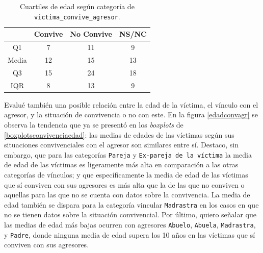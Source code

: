 \documentclass[10 pt]{article}
\begin{document}
\begin{table}[H]
    \centering
    \small
    \begin{center}
    \caption{Cuartiles de edad según categoría de \texttt{victima\_convive\_agresor}.}
    \label{cuartilesconviveedad}
    \begin{tabular}{cccc}
    \hline
    \multicolumn{1}{r}{\textbf{}} & \textbf{Convive} & \textbf{No Convive} & \textbf{ NS/NC} \\ \hline
    Q1                            & 7                    & 11                   & 9                       \\
    Media                         & 12                   & 15                   & 13                      \\
    Q3                            & 15                   & 24                   & 18                      \\
    IQR                           & 8                   & 13                   & 9                     \\ \hline
    \end{tabular}
    \end{center}
    \end{table}


Evalué también una posible relación entre la edad de la víctima, el vínculo con el agresor, y la situación de convivencia o no con este. En la figura \ref{edadconvagr} se observa la tendencia que ya se presentó en los \textit{boxplots} de \ref{boxplotsconvivenciaedad}: las medias de edades de las víctimas según sus situaciones convivenciales con el agresor son similares entre sí. Destaco, sin embargo, que para las categorías \texttt{Pareja} y \texttt{Ex-pareja de la víctima} la media de edad de las víctimas es ligeramente más alta en comparación a las otras categorías de vínculos; y que específicamente la media de edad de las víctimas que sí conviven con sus agresores es más alta que la de las que no conviven o aquellas para las que no se cuenta con datos sobre la convivencia. La media de edad también se dispara para la categoría vincular \texttt{Madrastra} en los casos en que no se tienen datos sobre la situación convivencial. Por último, quiero señalar que las medias de edad más bajas ocurren con agresores \texttt{Abuelo}, \texttt{Abuela}, \texttt{Madrastra}, y \texttt{Padre}, donde ninguna media de edad supera los 10 años en las víctimas que sí conviven con sus agresores.
\end{document}

